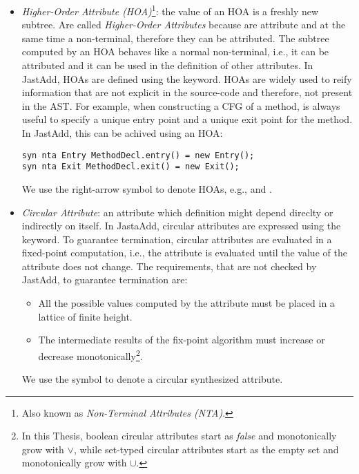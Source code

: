 \begin{itemize}
    \item \emph{Higher-Order Attribute (HOA)}\footnote{Also known as \emph{Non-Terminal Attributes (NTA)}.}:
    the value of an HOA is a freshly new subtree. Are called \emph{Higher-Order Attributes}
    because are attribute and at the same time a non-terminal, therefore they can be attributed.
    The subtree computed by an HOA behaves like a normal non-terminal, i.e., it can be
    attributed and it can be used in the definition of other attributes. In JastAdd, HOAs
    are defined using the  keyword. HOAs are widely used to reify information
    that are not explicit in the source-code and therefore, not present in the AST.
    For example, when constructing a CFG of a method, is always useful to specify
    a unique entry point and a unique exit point for the method. In JastAdd, this can be
    achived using an HOA:
    \begin{lstlisting}[language=JastAdd]
syn nta Entry MethodDecl.entry() = new Entry();
syn nta Exit MethodDecl.exit() = new Exit();
    \end{lstlisting}
    We use the right-arrow symbol to denote HOAs, e.g.,   and .
    \item \emph{Circular Attribute}: an attribute which definition might depend direclty
    or indirectly on itself. In JastaAdd, circular attributes are expressed using the 
    keyword. To guarantee termination, circular attributes are evaluated in a fixed-point
    computation, i.e., the attribute is evaluated until the value of the attribute does not change.
    The requirements, that are not checked by JastAdd, to guarantee termination are:
    \begin{itemize}
        \item All the possible values computed by the attribute must be placed
        in a lattice of finite height.
        \item The intermediate results of the fix-point algorithm must increase
        or decrease monotonically\footnote{In this Thesis, boolean circular attributes start
        as \emph{false} and monotonically grow with $\vee$, while set-typed circular attributes
        start as the empty set and monotonically grow with $\cup$.}.
    \end{itemize}
    We use the symbol  to denote a circular synthesized attribute.


\end{itemize}
